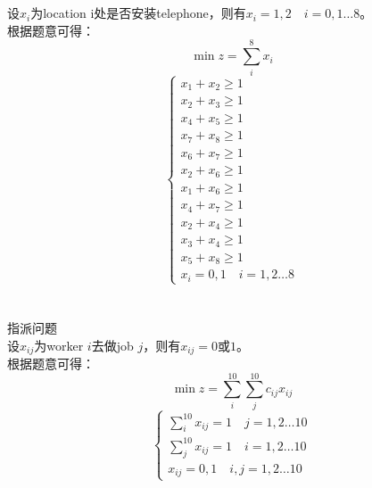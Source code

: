 \documentclass{article}
\begin{document}
\section{}
\noindent
设$x_i$为location i处是否安装telephone，则有$x_i=1,2 \quad i=0,1\dots 8$。\\
根据题意可得：
\[\min z=\sum _i^8 x_i\]
\begin{equation*}
    \left\{
        \begin{array}{l}
            x_1+x_2 \geq 1 \\
            x_2+x_3 \geq 1 \\
            x_4+x_5 \geq 1 \\
            x_7+x_8 \geq 1 \\
            x_6+x_7 \geq 1 \\
            x_2+x_6 \geq 1 \\
            x_1+x_6 \geq 1 \\
            x_4+x_7 \geq 1 \\
            x_2+x_4 \geq 1 \\
            x_3+x_4 \geq 1 \\
            x_5+x_8 \geq 1 \\
            x_i=0,1 \quad i=1,2\dots 8
        \end{array}
        \right.
\end{equation*}
\section{}
\noindent
指派问题\\
设$x_{ij}$为worker $i$去做job $j$，则有$x_{ij}=0$或$1$。\\
根据题意可得：
\[\min z=\sum _i^{10}\sum _j^{10}c_{ij}x_{ij}\]
\begin{equation*}
    \left\{
        \begin{array}{l}
            \sum _i^{10}x_{ij}=1 \quad j=1,2 \dots 10 \\
            \sum _j^{10}x_{ij}=1 \quad i=1,2 \dots 10 \\
            x_{ij}=0,1 \quad i,j=1,2\dots 10
        \end{array}
        \right.
\end{equation*}
\end{document}
